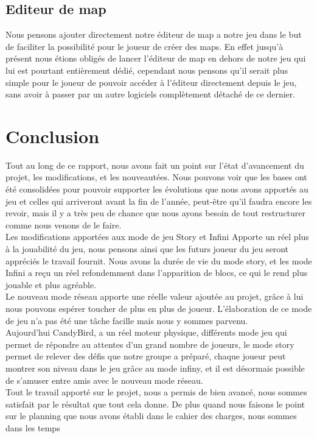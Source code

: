\documentclass [11pt]{report}
\begin{document}
	\section{Editeur de map}
		Nous pensons ajouter directement notre éditeur de map a notre jeu dans le but de faciliter la possibilité pour le joueur de créer des maps. En effet jusqu'à présent nous étions obligés de lancer l'éditeur de map en dehors de notre jeu qui lui est pourtant entièrement dédié, cependant nous pensons qu'il serait plus simple pour le joueur de pouvoir accéder à l'éditeur directement depuis le jeu, sans avoir à passer par un autre logiciels complètement détaché de ce dernier. 
		
		
		
\chapter*{Conclusion}
	Tout au long de ce rapport, nous avons fait un point sur l'\'etat d'avancement du projet, les modifications, et les nouveaut\'ees. Nous pouvons voir que les bases ont \'et\'e consolid\'ees pour pouvoir supporter les \'evolutions que nous avons apport\'es au jeu et celles qui arriveront avant la fin de l'ann\'ee, peut-\^etre qu'il faudra encore les revoir, mais il y a tr\`es peu de chance que nous ayons besoin de tout restructurer comme nous venons de le faire. \\
	
	Les modifications apport\'ees aux mode de jeu Story et Infini Apporte un r\'eel plus \`a la jouabilit\'e du jeu, nous pensons ainsi que les futurs joueur du jeu seront appr\'eci\'es le travail fournit. Nous avons la dur\'ee de vie du mode story, et les mode Infini a reçu un r\'eel refondemment dans l'apparition de blocs, ce qui le rend plus jouable et plus agr\'eable.\\
	
	Le nouveau mode r\'eseau apporte une r\'eelle valeur ajout\'ee au projet, gr\^ace \`a lui nous pouvons esp\'erer toucher de plus en plus de joueur. L'\'elaboration de ce mode de jeu n'a pas \'et\'e une t\^ache facille mais nous y sommes parvenu.\\
	
	Aujourd'hui CandyBird, a un r\'eel moteur physique, diff\'erents mode jeu qui permet de r\'epondre au attentes d'un grand nombre de joueurs, le mode story permet de relever des d\'efis que notre groupe a pr\'epar\'e, chaque joueur peut montrer son niveau dans le jeu gr\^ace au mode infiny, et il est d\'esormais possible de s'amuser entre amis avec le nouveau mode r\'eseau.\\
	
	Tout le travail apport\'e sur le projet, nous a permis de bien avanc\'e, nous sommes satisfait par le r\'esultat que tout cela donne. De plus quand nous faisons le point sur le planning que nous avons \'etabli dans le cahier des charges, nous sommes dans les temps 
\end{document}
